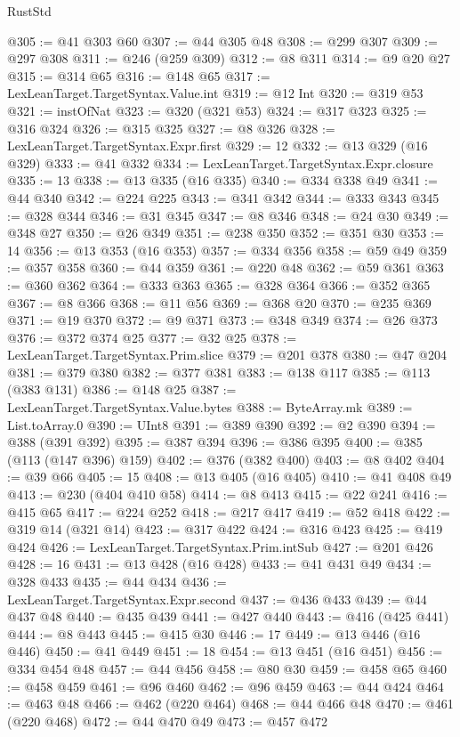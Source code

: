 \begin{lexlean}{RustStd}
\begin{coremodule}
@305 := @41 @303 @60
@307 := @44 @305 @48
@308 := @299 @307
@309 := @297 @308
@311 := @246 (@259 @309)
@312 := @8 @311
@314 := @9 @20 @27
@315 := @314 @65
@316 := @148 @65
@317 := LexLeanTarget.TargetSyntax.Value.int
@319 := @12 Int
@320 := @319 @53
@321 := instOfNat
@323 := @320 (@321 @53)
@324 := @317 @323
@325 := @316 @324
@326 := @315 @325
@327 := @8 @326
@328 := LexLeanTarget.TargetSyntax.Expr.first
@329 := 12
@332 := @13 @329 (@16 @329)
@333 := @41 @332
@334 := LexLeanTarget.TargetSyntax.Expr.closure
@335 := 13
@338 := @13 @335 (@16 @335)
@340 := @334 @338 @49
@341 := @44 @340
@342 := @224 @225
@343 := @341 @342
@344 := @333 @343
@345 := @328 @344
@346 := @31 @345
@347 := @8 @346
@348 := @24 @30
@349 := @348 @27
@350 := @26 @349
@351 := @238 @350
@352 := @351 @30
@353 := 14
@356 := @13 @353 (@16 @353)
@357 := @334 @356
@358 := @59 @49
@359 := @357 @358
@360 := @44 @359
@361 := @220 @48
@362 := @59 @361
@363 := @360 @362
@364 := @333 @363
@365 := @328 @364
@366 := @352 @365
@367 := @8 @366
@368 := @11 @56
@369 := @368 @20
@370 := @235 @369
@371 := @19 @370
@372 := @9 @371
@373 := @348 @349
@374 := @26 @373
@376 := @372 @374 @25
@377 := @32 @25
@378 := LexLeanTarget.TargetSyntax.Prim.slice
@379 := @201 @378
@380 := @47 @204
@381 := @379 @380
@382 := @377 @381
@383 := @138 @117
@385 := @113 (@383 @131)
@386 := @148 @25
@387 := LexLeanTarget.TargetSyntax.Value.bytes
@388 := ByteArray.mk
@389 := List.toArray.{0}
@390 := UInt8
@391 := @389 @390
@392 := @2 @390
@394 := @388 (@391 @392)
@395 := @387 @394
@396 := @386 @395
@400 := @385 (@113 (@147 @396) @159)
@402 := @376 (@382 @400)
@403 := @8 @402
@404 := @39 @66
@405 := 15
@408 := @13 @405 (@16 @405)
@410 := @41 @408 @49
@413 := @230 (@404 @410 @58)
@414 := @8 @413
@415 := @22 @241
@416 := @415 @65
@417 := @224 @252
@418 := @217 @417
@419 := @52 @418
@422 := @319 @14 (@321 @14)
@423 := @317 @422
@424 := @316 @423
@425 := @419 @424
@426 := LexLeanTarget.TargetSyntax.Prim.intSub
@427 := @201 @426
@428 := 16
@431 := @13 @428 (@16 @428)
@433 := @41 @431 @49
@434 := @328 @433
@435 := @44 @434
@436 := LexLeanTarget.TargetSyntax.Expr.second
@437 := @436 @433
@439 := @44 @437 @48
@440 := @435 @439
@441 := @427 @440
@443 := @416 (@425 @441)
@444 := @8 @443
@445 := @415 @30
@446 := 17
@449 := @13 @446 (@16 @446)
@450 := @41 @449
@451 := 18
@454 := @13 @451 (@16 @451)
@456 := @334 @454 @48
@457 := @44 @456
@458 := @80 @30
@459 := @458 @65
@460 := @458 @459
@461 := @96 @460
@462 := @96 @459
@463 := @44 @424
@464 := @463 @48
@466 := @462 (@220 @464)
@468 := @44 @466 @48
@470 := @461 (@220 @468)
@472 := @44 @470 @49
@473 := @457 @472

\end{coremodule}
\end{lexlean}
